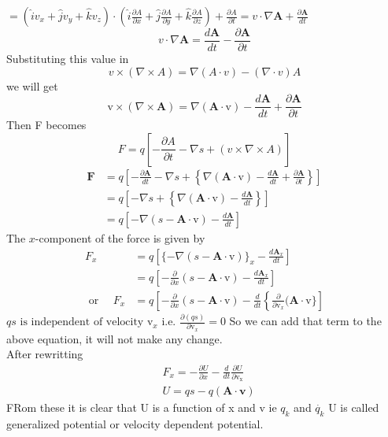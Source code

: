 $=(\hat{i}v_x+\hat{j}v_y+\hat{k}v_z)\cdot \left( \hat{i}\frac{\partial A}{\partial x}+\hat{j}\frac{\partial A}{\partial y}+\hat{k}\frac{\partial A}{\partial z}\right) +\frac{\partial A}{\partial t}=v \cdot \nabla \mathbf{A}+\frac{\partial \mathbf{A}}{d t}$ \\
$$v \cdot\nabla \mathbf{A}=\frac{d \mathbf{A}}{d t}-\frac{\partial \mathbf{A}}{\partial t}$$
Substituting this value in 
$$v\times(\nabla \times A)=\nabla (A\cdot v)-(\nabla \cdot v)A$$
we will get \\
$$\mathrm{v} \times(\nabla \times \mathbf{A})=\nabla(\mathbf{A} \cdot \mathrm{v})-\frac{d \mathbf{A}}{d t}+\frac{\partial \mathbf{A}}{\partial t}$$
Then F becomes\\
$$F=q\left[ -\frac{\partial A}{\partial t}-\nabla s+(v\times \nabla \times A)\right] $$
$$\begin{aligned}
\mathbf{F} &=q\left[-\frac{\partial \mathbf{A}}{d t}-\nabla s+\left\{\nabla(\mathbf{A} \cdot \mathrm{v})-\frac{d \mathbf{A}}{d t}+\frac{\partial \mathbf{A}}{\partial t}\right\}\right] \\
&=q\left[-\nabla s+\left\{\nabla(\mathbf{A} \cdot \mathrm{v})-\frac{d \mathbf{A}}{d t}\right\}\right] \\
&=q\left[-\nabla(s-\mathbf{A} \cdot \mathrm{v})-\frac{d \mathbf{A}}{d t}\right]
\end{aligned}$$
The $x$-component of the force is given by
$$
\begin{aligned}
F_{x} &=q\left[\{-\nabla(s-\mathbf{A} \cdot \mathrm{v})\}_{x}-\frac{d \mathbf{A}_{x}}{d t}\right] \\
&=q\left[-\frac{\partial}{\partial x}(s-\mathbf{A} \cdot \mathrm{v})-\frac{d \mathbf{A}_{x}}{d t}\right] \\
\text { or } \quad F_{x} &=q\left[-\frac{\partial}{\partial x}(s-\mathbf{A} \cdot \mathrm{v})-\frac{d}{d t}\left\{\frac{\partial}{\partial \mathrm{v}_{x}}(\mathbf{A} \cdot \mathrm{v}\}\right]\right.
\end{aligned}
$$
$q s \text { is independent of velocity } \mathrm{v}_{x} \text { i.e. } \frac{\partial(q s)}{\partial \mathrm{v}_{x}}=0$
So we can add that term to the above equation, it will not make any change.\\
After rewritting\\
$$\begin{aligned}
&F_{x}=-\frac{\partial U}{\partial x}-\frac{d}{d t} \frac{\partial U}{\partial \mathrm{v}_{\mathrm{x}}} \\
&U=q s-q(\mathbf{A} \cdot \mathbf{v})
\end{aligned}$$
FRom these it is clear that  U is a function of x and v ie $q_k$ and $\dot{q_k}$
U is called generalized potential or velocity dependent potential.\\
